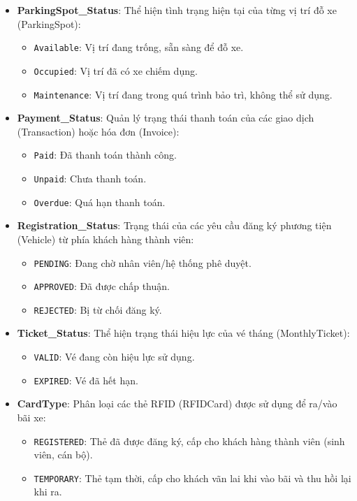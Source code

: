 \begin{itemize}
    \item \textbf{ParkingSpot\_Status}: Thể hiện tình trạng hiện tại của từng vị trí đỗ xe (ParkingSpot):
    \begin{itemize}
        \item \texttt{Available}: Vị trí đang trống, sẵn sàng để đỗ xe.
        \item \texttt{Occupied}: Vị trí đã có xe chiếm dụng.
        \item \texttt{Maintenance}: Vị trí đang trong quá trình bảo trì, không thể sử dụng.
    \end{itemize}

    \item \textbf{Payment\_Status}: Quản lý trạng thái thanh toán của các giao dịch (Transaction) hoặc hóa đơn (Invoice):
    \begin{itemize}
        \item \texttt{Paid}: Đã thanh toán thành công.
        \item \texttt{Unpaid}: Chưa thanh toán.
        \item \texttt{Overdue}: Quá hạn thanh toán.
    \end{itemize}

    \item \textbf{Registration\_Status}: Trạng thái của các yêu cầu đăng ký phương tiện (Vehicle) từ phía khách hàng thành viên:
    \begin{itemize}
        \item \texttt{PENDING}: Đang chờ nhân viên/hệ thống phê duyệt.
        \item \texttt{APPROVED}: Đã được chấp thuận.
        \item \texttt{REJECTED}: Bị từ chối đăng ký.
    \end{itemize}

    \item \textbf{Ticket\_Status}: Thể hiện trạng thái hiệu lực của vé tháng (MonthlyTicket):
    \begin{itemize}
        \item \texttt{VALID}: Vé đang còn hiệu lực sử dụng.
        \item \texttt{EXPIRED}: Vé đã hết hạn.
    \end{itemize}

    \item \textbf{CardType}: Phân loại các thẻ RFID (RFIDCard) được sử dụng để ra/vào bãi xe:
    \begin{itemize}
        \item \texttt{REGISTERED}: Thẻ đã được đăng ký, cấp cho khách hàng thành viên (sinh viên, cán bộ).
        \item \texttt{TEMPORARY}: Thẻ tạm thời, cấp cho khách vãn lai khi vào bãi và thu hồi lại khi ra.
    \end{itemize}
\end{itemize}



